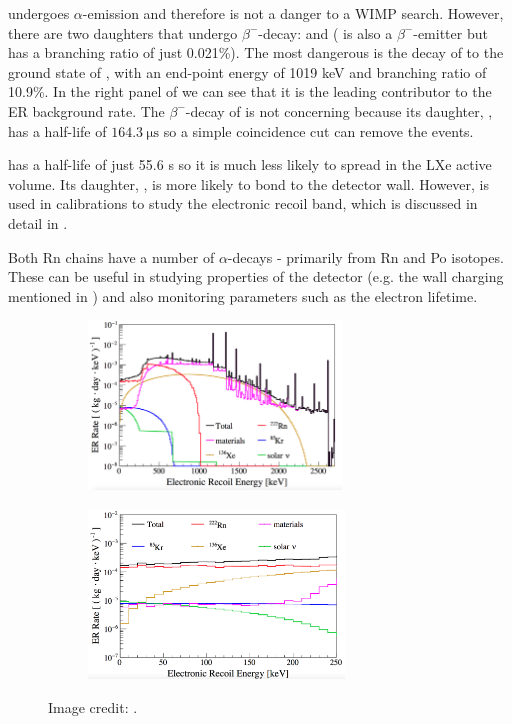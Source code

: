 { undergoes $\alpha$-emission and therefore is not a danger to a WIMP search.  However, there are two daughters that undergo
$\beta^-$-decay:  and  ( is also a $\beta^-$-emitter but has a branching ratio of just
0.021\%).  The most dangerous is the decay of  to the ground state of , with an end-point energy of 1019 keV and
branching ratio of 10.9\%.  In the right panel of  we can see that it is the leading contributor to
the ER
background rate.  The $\beta^-$-decay of  is not concerning because its daughter, , has a half-life of
$164.3\ \mathrm{\mu s}$ so a simple coincidence cut can remove the events.

 has a half-life of just 55.6 s so it is much less likely to spread in the LXe active volume.  Its daughter, ,
is more likely to bond to the detector wall.  However,  is used in calibrations to study the electronic recoil band, which is
discussed in detail in .

Both Rn chains have a number of $\alpha$-decays - primarily from Rn and Po isotopes.  These can be useful in studying properties of the
detector (e.g. the wall charging mentioned in ) and also monitoring parameters such as
the electron lifetime.

\begin{figure}
    \centering
    \begin{subfigure}[t]{0.45\textwidth}
        \centering
        \includegraphics[height=4.5cm]{ERRateMCFull}
    \end{subfigure}%
    \begin{subfigure}[t]{0.45\textwidth}
        \centering
        \includegraphics[height=4.5cm]{ERRateMCZoomed}
    \end{subfigure}
    \caption{Image credit: %
    .}
	\label{fig:backgrounds_er_spectrum}
\end{figure}



}
